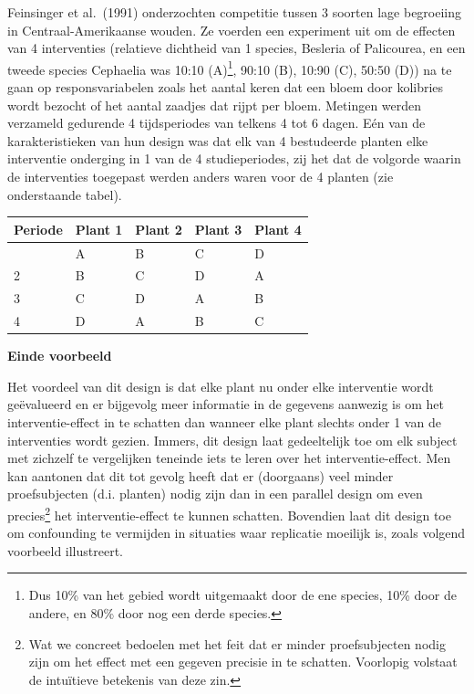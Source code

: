 \documentclass[
  12pt,dutch]{book}
\newcounter{none} %
\theoremstyle{definition}
\theoremstyle{definition}
\theoremstyle{definition}
\theoremstyle{definition}
\theoremstyle{remark}
\begin{document}
Feinsinger et al.~(1991) onderzochten competitie tussen 3 soorten lage begroeiing in Centraal-Amerikaanse wouden. Ze voerden een experiment uit om de effecten van 4 interventies (relatieve dichtheid van 1 species, Besleria of Palicourea, en een tweede species Cephaelia was 10:10 (A)\footnote{Dus 10\% van het gebied wordt uitgemaakt door de ene species, 10\% door de andere, en 80\% door nog een derde species.}, 90:10 (B), 10:90 (C), 50:50 (D)) na te gaan op responsvariabelen zoals het aantal keren dat een bloem door kolibries wordt bezocht of het aantal zaadjes dat rijpt per bloem. Metingen werden verzameld gedurende 4 tijdsperiodes van telkens 4 tot 6 dagen. Eén van de karakteristieken van hun design was dat elk van 4 bestudeerde planten elke interventie onderging in 1 van de 4 studieperiodes, zij het dat de volgorde waarin de interventies toegepast werden anders waren voor de 4 planten (zie onderstaande tabel).

{\def\LTcaptype{none} %
\begin{longtable}[]{@{}lllll@{}}
\toprule\noalign{}
Periode & Plant 1 & Plant 2 & Plant 3 & Plant 4 \\
\midrule\noalign{}
\endhead
\bottomrule\noalign{}
\endlastfoot
1 & A & B & C & D \\
2 & B & C & D & A \\
3 & C & D & A & B \\
4 & D & A & B & C \\
\end{longtable}
}

\textbf{Einde voorbeeld}

Het voordeel van dit design is dat elke plant nu onder elke
interventie wordt geëvalueerd en er bijgevolg meer informatie in de
gegevens aanwezig is om het interventie-effect in te schatten dan wanneer
elke plant slechts onder 1 van de interventies wordt gezien. Immers, dit design laat gedeeltelijk toe om elk subject met zichzelf te vergelijken teneinde iets te leren over het interventie-effect. Men kan
aantonen dat dit tot gevolg heeft dat er (doorgaans) veel minder
proefsubjecten (d.i. planten) nodig zijn dan in een parallel design om even precies\footnote{Wat we concreet bedoelen met het feit dat er minder proefsubjecten nodig zijn
  om het effect met een gegeven precisie in te schatten. Voorlopig volstaat de intuïtieve betekenis van deze zin.} het interventie-effect te kunnen
schatten. Bovendien laat dit design toe om confounding te vermijden in situaties waar replicatie moeilijk is, zoals volgend voorbeeld illustreert.
\end{document}
